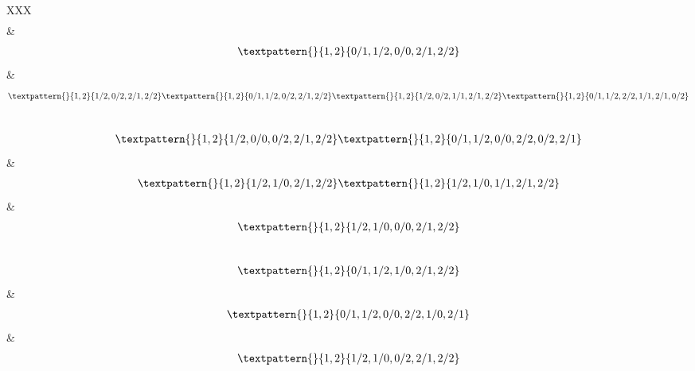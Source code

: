 \begin{center}
\begin{longtabu}[l]{XXX}
\begin{equation}
\begin{gathered}
	\end{gathered}
	\label{cls:167}
\end{equation}
    &
\begin{equation}
	\begin{gathered}
		\textpattern{}{1,2}{0/1,1/2,0/0,2/1,2/2}
	\end{gathered}
	\label{cls:168}
\end{equation}
    &
\begin{equation}
	\begin{gathered}
		\textpattern{}{1,2}{1/2,0/2,2/1,2/2}
		\textpattern{}{1,2}{0/1,1/2,0/2,2/1,2/2}
		\textpattern{}{1,2}{1/2,0/2,1/1,2/1,2/2}
		\textpattern{}{1,2}{0/1,1/2,2/2,1/1,2/1,0/2}
	\end{gathered}
	\label{cls:169}
\end{equation}
  \\
\begin{equation}
	\begin{gathered}
		\textpattern{}{1,2}{1/2,0/0,0/2,2/1,2/2}
		\textpattern{}{1,2}{0/1,1/2,0/0,2/2,0/2,2/1}
	\end{gathered}
	\label{cls:170}
\end{equation}
    &
\begin{equation}
	\begin{gathered}
		\textpattern{}{1,2}{1/2,1/0,2/1,2/2}
		\textpattern{}{1,2}{1/2,1/0,1/1,2/1,2/2}
	\end{gathered}
	\label{cls:171}
\end{equation}
    &
\begin{equation}
	\begin{gathered}
		\textpattern{}{1,2}{1/2,1/0,0/0,2/1,2/2}
	\end{gathered}
	\label{cls:172}
\end{equation}
\\
\begin{equation}
	\begin{gathered}
		\textpattern{}{1,2}{0/1,1/2,1/0,2/1,2/2}
	\end{gathered}
	\label{cls:173}
\end{equation}
    &
\begin{equation}
	\begin{gathered}
		\textpattern{}{1,2}{0/1,1/2,0/0,2/2,1/0,2/1}
	\end{gathered}
	\label{cls:174}
\end{equation}
&
\begin{equation}
	\begin{gathered}
		\textpattern{}{1,2}{1/2,1/0,0/2,2/1,2/2}

\end{gathered}
\end{equation}
\end{longtabu}
\end{center}

